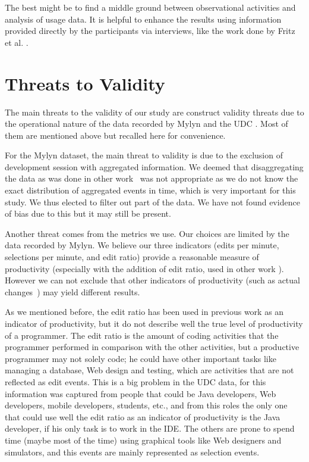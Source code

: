 \documentclass[times]{smrauth}
\newcommand\RR[1]{\textbf{Romain #1}}
\begin{document}
The best might be to find a middle ground between observational activities and analysis of usage data. It is helpful to enhance the results using information provided directly by the participants via interviews, like the work done by Fritz et al. \cite{FMH07}.

\section{Threats to Validity}
The main threats to the validity of our study are construct validity threats due to the operational nature of the data recorded by Mylyn and the UDC \cite{M14}. Most of them are mentioned above but recalled here for convenience.

For the Mylyn dataset, the main threat to validity is due to the exclusion of development session with aggregated information. We deemed that disaggregating the data as was done in other work~\cite{YR11}  was not appropriate as we do not know the exact distribution of aggregated events in time, which is very important for this study. We thus elected to filter out part of the data. We have not found evidence of bias due to this but it may still be present.

Another threat comes from the metrics we use. Our choices are limited by the data recorded by Mylyn. We believe our three indicators (edits per minute, selections per minute, and edit ratio) provide a reasonable measure of productivity (especially with the addition of edit ratio, used in other work \cite{KM06}). However we can not exclude that other indicators of productivity (such as actual changes~\cite{RL10}) may yield different results.

As we mentioned before, the edit ratio has been used in previous work as an indicator of productivity, but it do not describe well the true level of productivity of a programmer. The edit ratio is the amount of coding activities that the programmer performed in comparison with the other activities, but a productive programmer may not solely code; he could have other important tasks like managing a database, Web design and testing, which are activities that are not reflected as edit events. This is a big problem in the UDC data, for this information was captured from people that could be Java developers, Web developers, mobile developers, students, etc., and from this roles the only one that could use well the edit ratio as an indicator of productivity is the Java developer, if his only task is to work in the IDE. The others are prone to spend time (maybe most of the time) using graphical tools like Web designers and simulators, and this events are mainly represented as selection events.
\end{document}
